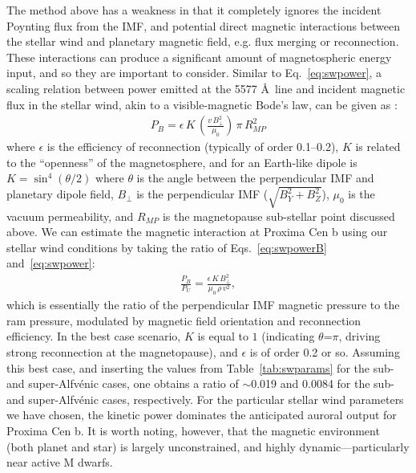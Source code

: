 \documentclass{emulateapj}
\begin{document}
The method above has a weakness in that it completely ignores the incident Poynting flux from the IMF, and potential direct magnetic interactions between the stellar wind and planetary magnetic field, e.g. flux merging or reconnection. These interactions can produce a significant amount of magnetospheric energy input, and so they are important to consider. Similar to Eq.~\ref{eq:swpower}, a scaling relation between power emitted at the 5577 \AA\ line and incident magnetic flux in the stellar wind, akin to a visible-magnetic Bode's law, can be given as \citep[e.g.,][]{Zarka2006,Zarka2007,Grie2007}:
%
\begin{align}
    P_{B} = \epsilon\, K\, \left( \frac{v\,B_{\perp}^2}{\mu_0} \right)\,\pi\,R_{MP}^2 \label{eq:swpowerB}
\end{align}
%
where $\epsilon$ is the efficiency of reconnection (typically of order 0.1--0.2), $K$ is related to the ``openness'' of the magnetosphere, and for an Earth-like dipole is $K = \sin^4(\theta/2)$ where $\theta$ is the angle between the perpendicular IMF and planetary dipole field, $B_{\perp}$ is the perpendicular IMF ($\sqrt{B_Y^2+B_Z^2}$), $\mu_0$ is the vacuum permeability, and $R_{MP}$ is the magnetopause sub-stellar point discussed above. We can estimate the magnetic interaction at Proxima Cen b using our stellar wind conditions by taking the ratio of Eqs.~\ref{eq:swpowerB} and~\ref{eq:swpower}:
%
\begin{align}
    \frac{P_B}{P_U} = \frac{\epsilon\, K\, B_{\perp}^2}{\mu_0\, \rho\,v^2}, \label{eq:swpower_ratio}
\end{align}
%
which is essentially the ratio of the perpendicular IMF magnetic pressure to the ram pressure, modulated by magnetic field orientation and reconnection efficiency. In the best case scenario, $K$ is equal to $1$ (indicating $\theta$=$\pi$, driving strong reconnection at the magnetopause), and $\epsilon$ is of order 0.2 or so. Assuming this best case, and inserting the values from Table~\ref{tab:swparams} for the sub- and super-Alfv\'{e}nic cases, one obtains a ratio of $\sim$0.019 and 0.0084 for the sub- and super-Alfv\'{e}nic cases, respectively. For the particular stellar wind parameters we have chosen, the kinetic power dominates the anticipated auroral output for Proxima Cen b. It is worth noting, however, that the magnetic environment (both planet and star) is largely unconstrained, and highly dynamic---particularly near active M dwarfs.
\end{document}
